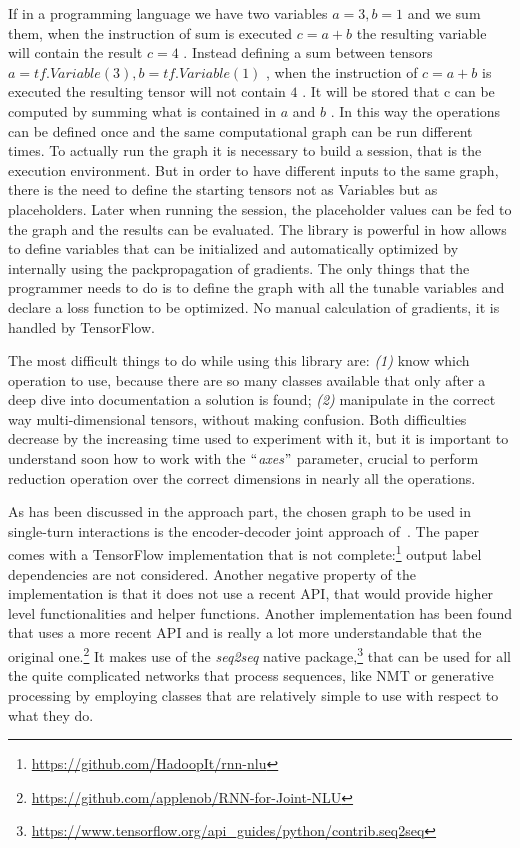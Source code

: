 If in a programming language we have two variables  \( a=3,b=1 \)  and we sum them, when the instruction of sum is executed  \( c=a+b \)  the resulting variable will contain the result  \( c=4 \) . Instead defining a sum between tensors  \( a=tf.Variable \left( 3 \right) ,b=tf.Variable \left( 1 \right)  \) , when the instruction of  \( c=a+b \)  is executed the resulting tensor will not contain  \( 4 \) . It will be stored that c can be computed by summing what is contained in  \( a \)  and  \( b \) . In this way the operations can be defined once and the same computational graph can be run different times. To actually run the graph it is necessary to build a session, that is the execution environment. But in order to have different inputs to the same graph, there is the need to define the starting tensors not as Variables but as placeholders. Later when running the session, the placeholder values can be fed to the graph and the results can be evaluated. The library is powerful in how allows to define variables that can be initialized and automatically optimized by internally using the packpropagation of gradients. The only things that the programmer needs to do is to define the graph with all the tunable variables and declare a loss function to be optimized. No manual calculation of gradients, it is handled by TensorFlow.

The most difficult things to do while using this library are: \textit{(1)} know which operation to use, because there are so many classes available that only after a deep dive into documentation a solution is found; \textit{(2)} manipulate in the correct way multi-dimensional tensors, without making confusion. Both difficulties decrease by the increasing time used to experiment with it, but it is important to understand soon how to work with the $``$\textit{axes}$"$  parameter, crucial to perform reduction operation over the correct dimensions in nearly all the operations.

As has been discussed in the approach part, the chosen graph to be used in single-turn interactions is the encoder-decoder joint approach of~\cite{liu2016attention}. The paper comes with a TensorFlow implementation that is not complete:\footnote{\url{https://github.com/HadoopIt/rnn-nlu}} output label dependencies are not considered. Another negative property of the implementation is that it does not use a recent API, that would provide higher level functionalities and helper functions. Another implementation has been found that uses a more recent API and is really a lot more understandable that the original one.\footnote{\url{https://github.com/applenob/RNN-for-Joint-NLU}} It makes use of the \textit{seq2seq} native package,\footnote{\url{https://www.tensorflow.org/api\_guides/python/contrib.seq2seq}} that can be used for all the quite complicated networks that process sequences, like NMT or generative processing by employing classes that are relatively simple to use with respect to what they do.

